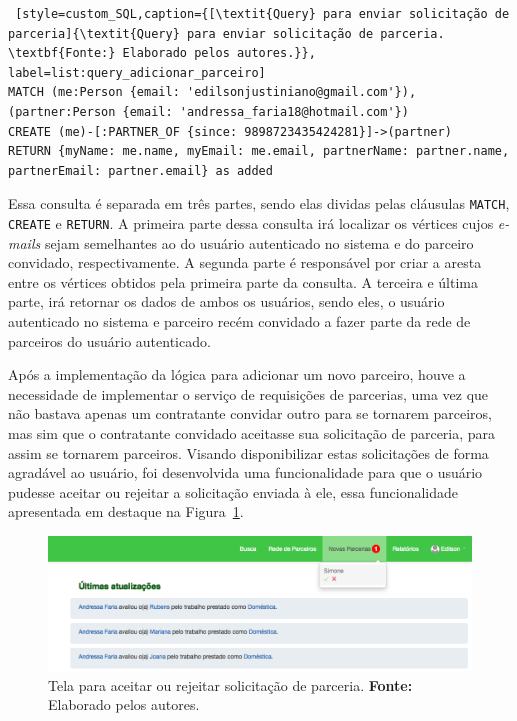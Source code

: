 \begin{lstlisting} [style=custom_SQL,caption={[\textit{Query} para enviar solicitação de parceria]{\textit{Query} para enviar solicitação de parceria. \textbf{Fonte:} Elaborado pelos autores.}}, label=list:query_adicionar_parceiro] 	
MATCH (me:Person {email: 'edilsonjustiniano@gmail.com'}),
(partner:Person {email: 'andressa_faria18@hotmail.com'})
CREATE (me)-[:PARTNER_OF {since: 9898723435424281}]->(partner)
RETURN {myName: me.name, myEmail: me.email, partnerName: partner.name, 
partnerEmail: partner.email} as added
\end{lstlisting}

\par Essa consulta é separada em três partes, sendo elas dividas pelas cláusulas \texttt{MATCH}, \texttt{CREATE} e \texttt{RETURN}. A primeira parte dessa consulta irá localizar os vértices cujos \textit{e-mails} sejam semelhantes ao do usuário autenticado no sistema e do parceiro convidado, respectivamente. A segunda parte é responsável por criar a aresta entre os vértices obtidos pela primeira parte da consulta. A terceira e última parte, irá retornar os dados de ambos os usuários, sendo eles, o usuário autenticado no sistema e parceiro recém convidado a fazer parte da rede de parceiros do usuário autenticado.

\par Após a implementação da lógica para adicionar um novo parceiro, houve a necessidade de implementar o serviço de requisições de parcerias, uma vez que não bastava apenas um contratante convidar outro para se tornarem parceiros, mas sim que o contratante convidado aceitasse sua solicitação de parceria, para assim se tornarem parceiros. Visando disponibilizar estas solicitações de forma agradável ao usuário, foi desenvolvida uma funcionalidade para que o usuário pudesse aceitar ou rejeitar a solicitação enviada à ele, essa funcionalidade apresentada em destaque na Figura~\ref{fig:aceitar_rejeitar_solicitacao_parceria}.

\begin{figure}[h!]
	\centerline{\includegraphics[scale=0.45]{./imagens/aceitar_rejeitar_solicitacao_parceria.png}}
	\caption[Tela para aceitar ou rejeitar solicitação de parceria]
	{Tela para aceitar ou rejeitar solicitação de parceria. \textbf{Fonte:} Elaborado pelos autores.}
	\label{fig:aceitar_rejeitar_solicitacao_parceria}
\end{figure}


